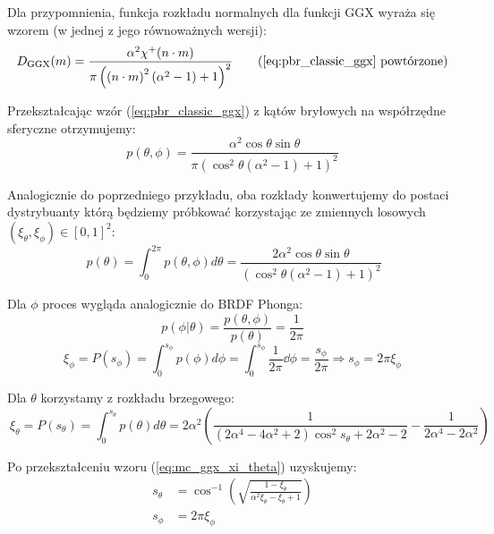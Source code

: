 \documentclass[../main.tex]{subfiles}
\begin{document}
Dla przypomnienia, funkcja rozkładu normalnych dla funkcji GGX wyraża się wzorem (w jednej z jego równoważnych wersji):
\begin{equation*}
D_{\text{GGX}}(m) =
\frac{
    \alpha^2 \chi^{+}(n \cdot m)
}{
    \pi \left(
    \left(n \cdot m \right)^{2}
    \left(\alpha^2 - 1 \right)
    + 1
    \right)^2
}
\tag{\ref{eq:pbr_classic_ggx} powtórzone}
\end{equation*}

Przekształcając wzór (\ref{eq:pbr_classic_ggx}) z kątów bryłowych na współrzędne sferyczne otrzymujemy:
\begin{equation}
  p(\theta, \phi) =
	\frac{
    \alpha^2 \cos\theta \sin\theta
	}{
    \pi \left(
      \cos^{2}\theta (\alpha^2 - 1) + 1
    \right)^{2}
  }
\end{equation}

Analogicznie do poprzedniego przykładu, oba rozkłady konwertujemy do postaci dystrybuanty którą będziemy próbkować korzystając ze zmiennych losowych $(\xi_{\theta}, \xi_{\phi}) \in [0,1]^2$:
\begin{equation}\
  p(\theta) = \int_{0}^{2\pi} {
    p(\theta, \phi) d \theta
  } =
  \frac{2 \alpha^2 \cos\theta \sin\theta}{
    \left(
      \cos^{2}\theta (\alpha^2 - 1) + 1
    \right)^{2}
  }
\end{equation}

Dla $\phi$ proces wygląda analogicznie do BRDF Phonga:
\begin{equation}
  p(\phi | \theta) = \frac{
    p(\theta, \phi)
	}{
		p(\theta)
	} = \frac{1}{2\pi}
\end{equation}
\begin{equation}
	\xi_\phi = P(s_{\phi}) =
	\int_{0}^{s_{\phi}} {
		p(\phi) d\phi
	} =
	\int_{0}^{s_{\phi}} {
		\frac{1}{2\pi}
        \dd \phi
	} =
	\frac{s_{\phi}}{2\pi}
  \Rightarrow
	s_{\phi} = 2 \pi \xi_{\phi}
\end{equation}

Dla $\theta$ korzystamy z rozkładu brzegowego:
\begin{equation}\
  \xi_\theta = P(s_{\theta}) =
	\int_{0}^{s_{\theta}} {
		p(\theta) d\theta
	} =
  2 \alpha^2 \left(
    \frac{1}{
      (2\alpha^4 - 4\alpha^2 + 2) \cos^{2}{s_\theta} + 2\alpha^2 - 2
    } - \frac{1}{
      2\alpha^4 - 2\alpha^2
    }
  \right)
\label{eq:mc_ggx_xi_theta}
\end{equation}

Po przekształceniu wzoru (\ref{eq:mc_ggx_xi_theta}) uzyskujemy:
\begin{equation}\begin{aligned}
  s_\theta &= \cos^{-1}\left(
    \sqrt{
      \frac{1 - \xi_\theta}{\alpha^2 \xi_\theta - \xi_\theta + 1}
    }
  \right) \\
  s_{\phi} &= 2 \pi \xi_{\phi}
\end{aligned}\end{equation}
\end{document}
